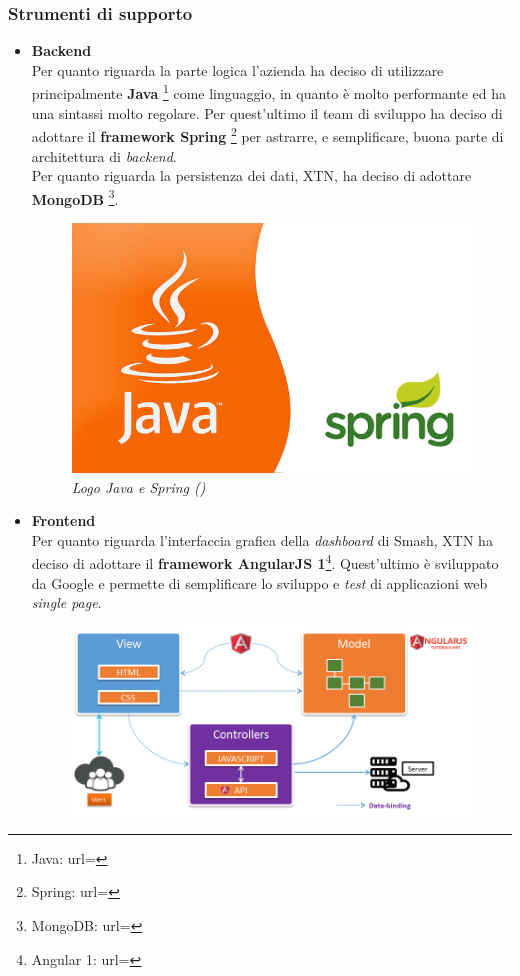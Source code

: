 \subsubsection{Strumenti di supporto}
\begin{itemize}
\item{\textbf{Backend}}\\
Per quanto riguarda la parte logica l'azienda ha deciso di utilizzare principalmente \textbf{Java} \footnote{Java: url= } come linguaggio, in quanto è molto performante ed ha una sintassi molto regolare. Per quest'ultimo il team di sviluppo ha deciso di adottare il \textbf{\gls{framework} Spring} \footnote{Spring: url= } per astrarre, e semplificare, buona parte di architettura di \textit{backend}.\\
Per quanto riguarda la persistenza dei dati, XTN, ha deciso di adottare \textbf{MongoDB} \footnote{MongoDB: url= }.
\begin{figure}[ht]
	\centering
	\includegraphics[scale=0.15]{immagini/java-spring.png}
	\caption{\textit{Logo Java e Spring ()}}
\end{figure}
\newpage
\item{\textbf{Frontend}}\\
Per quanto riguarda l'interfaccia grafica della \textit{dashboard} di Smash\textregistered, XTN ha deciso di adottare il \textbf{\gls{framework} AngularJS 1}\footnote{Angular 1: url= }. Quest'ultimo è sviluppato da Google e permette di semplificare lo sviluppo e \textit{test} di applicazioni web \textit{single page}.
\begin{figure}[ht]
	\centering
	\includegraphics[scale=0.3]{immagini/angular.png}

\end{figure}
\end{itemize}
